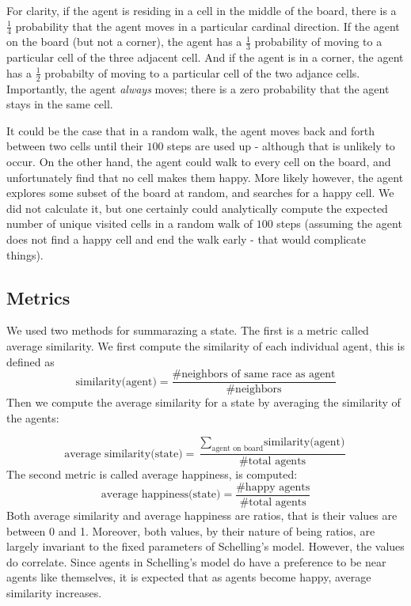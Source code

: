 \documentclass[11pt,twoside]{amsart}
\theoremstyle{theorem}
\theoremstyle{definition}
\theoremstyle{remark}
\begin{document}
For clarity, if the agent is residing in a cell in the middle of the board, there is a $\frac{1}{4}$ probability that the agent moves in a particular cardinal direction.
If the agent on the board (but not a corner), the agent has a $\frac{1}{3}$ probability of moving to a particular cell of the three adjacent cell.
And if the agent is in a corner, the agent has a $\frac{1}{2}$ probabilty of moving to a particular cell of the two adjance cells.
Importantly, the agent \emph{always} moves; there is a zero probability that the agent stays in the same cell.

It could be the case that in a random walk, the agent moves back and forth between two cells until their $100$ steps are used up - although that is unlikely to occur. 
On the other hand, the agent could walk to every cell on the board, and unfortunately find that no cell makes them happy. 
More likely however, the agent explores some subset of the board at random, and searches for a happy cell.
We did not calculate it, but one certainly could analytically compute the expected number of unique visited cells in a random walk of $100$ steps (assuming the agent does not find a happy cell and end the walk early - that would complicate things).

\subsection{Metrics}
We used two methods for summarazing a state. 
The first is a metric called average similarity. 
We first compute the similarity of each individual agent, this is defined as
\[ \text{similarity(agent)} = \frac{\text{\# neighbors of same race as agent}}{\text{\# neighbors}} \]
Then we compute the average similarity for a state by averaging the similarity of the agents:

\[\text{average similarity(state)} = \frac{\sum_{\text{agent on board}} \text{similarity(agent)}} {\text{\# total agents}} \]
The second metric is called average happiness, is computed:
\[ \text{average happiness(state)} = \frac{\text{\# happy agents}}{\text{\# total agents}} \]
Both average similarity and average happiness are ratios, that is their values are between 0 and 1. 
Moreover, both values, by their nature of being ratios, are largely invariant to the fixed parameters of Schelling's model. 
However, the values do correlate. Since agents in Schelling's model do have a preference to be near agents like themselves, it is expected that as agents become happy, average similarity increases. 
\end{document}
